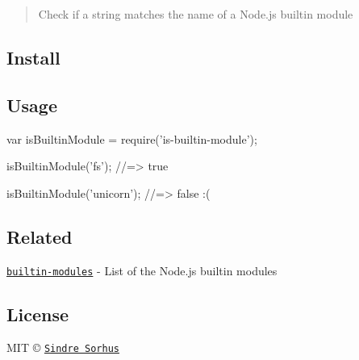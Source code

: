\begin{quote}
Check if a string matches the name of a Node.\+js builtin module \end{quote}


\subsection*{Install}




\subsection*{Usage}


\begin{DoxyCode}
var isBuiltinModule = require('is-builtin-module');

isBuiltinModule('fs');
//=> true

isBuiltinModule('unicorn');
//=> false :(
\end{DoxyCode}


\subsection*{Related}


\begin{DoxyItemize}
\item \href{https://github.com/sindresorhus/builtin-modules}{\tt builtin-\/modules} -\/ List of the Node.\+js builtin modules
\end{DoxyItemize}

\subsection*{License}

M\+IT © \href{http://sindresorhus.com}{\tt Sindre Sorhus} 